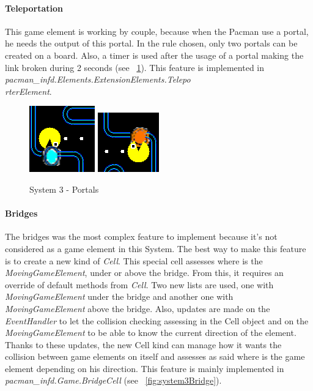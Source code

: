 \documentclass[]{article}
\begin{document}
\paragraph{Teleportation} This game element is working by couple, because when the Pacman use a portal, he needs the output of this portal. In the rule chosen, only two portals can be created on a board. Also, a timer is used after the usage of a portal making the link broken during 2 seconds (see ~\ref{fig:system3Portals}). This feature is implemented in \textit{pacman\_infd.Elements.ExtensionElements.Telepo\\rterElement}. 

\begin{figure}
\centering
    \includegraphics[width=.3\linewidth]{imgs/portal1.PNG}
    \includegraphics[width=.3\linewidth]{imgs/portal2.PNG}
    \caption{System 3 - Portals}
    \label{fig:system3Portals}
\end{figure}

\paragraph{Bridges} The bridges was the most complex feature to implement because it's not considered as a game element in this System. The best way to make this feature is to create a new kind of \textit{Cell}. This special cell assesses where is the \textit{MovingGameElement}, under or above the bridge. From this, it requires an override of default methods from \textit{Cell}. Two new lists are used, one with \textit{MovingGameElement} under the bridge and another one with \textit{MovingGameElement} above the bridge. Also, updates are made on the \textit{EventHandler} to let the collision checking assessing in the Cell object and on the \textit{MovingGameElement} to be able to know the current direction of the element. Thanks to these updates, the new Cell kind can manage how it wants the collision between game elements on itself and assesses as said where is the game element depending on his direction. This feature is mainly implemented in \textit{pacman\_infd.Game.BridgeCell} (see ~\ref{fig:system3Bridge}).
\end{document}
